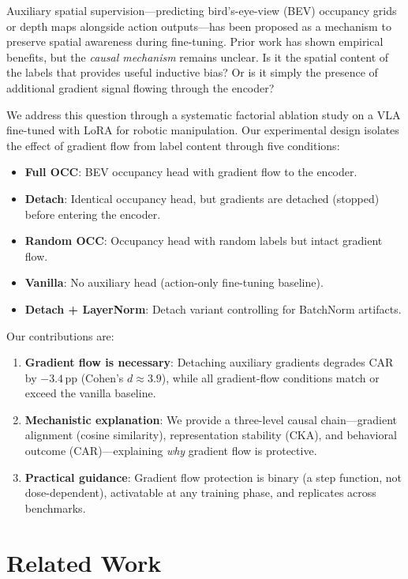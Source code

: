 \documentclass[letterpaper]{article}
\begin{document}
Auxiliary spatial supervision---predicting bird's-eye-view (BEV) occupancy grids or depth maps alongside action outputs---has been proposed as a mechanism to preserve spatial awareness during fine-tuning. Prior work has shown empirical benefits, but the \emph{causal mechanism} remains unclear. Is it the spatial content of the labels that provides useful inductive bias? Or is it simply the presence of additional gradient signal flowing through the encoder?

We address this question through a systematic factorial ablation study on a VLA fine-tuned with LoRA for robotic manipulation. Our experimental design isolates the effect of gradient flow from label content through five conditions:
\begin{itemize}
    \item \textbf{Full OCC}: BEV occupancy head with gradient flow to the encoder.
    \item \textbf{Detach}: Identical occupancy head, but gradients are detached (stopped) before entering the encoder.
    \item \textbf{Random OCC}: Occupancy head with random labels but intact gradient flow.
    \item \textbf{Vanilla}: No auxiliary head (action-only fine-tuning baseline).
    \item \textbf{Detach + LayerNorm}: Detach variant controlling for BatchNorm artifacts.
\end{itemize}

Our contributions are:
\begin{enumerate}
    \item \textbf{Gradient flow is necessary}: Detaching auxiliary gradients degrades CAR by $-3.4$\,pp (Cohen's $d \approx 3.9$), while all gradient-flow conditions match or exceed the vanilla baseline.
    \item \textbf{Mechanistic explanation}: We provide a three-level causal chain---gradient alignment (cosine similarity), representation stability (CKA), and behavioral outcome (CAR)---explaining \emph{why} gradient flow is protective.
    \item \textbf{Practical guidance}: Gradient flow protection is binary (a step function, not dose-dependent), activatable at any training phase, and replicates across benchmarks.
\end{enumerate}

\section{Related Work}
\label{sec:related}
\end{document}
